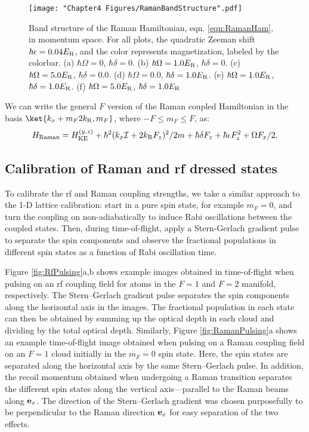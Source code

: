 \begin{figure}
	\texttt{[image: "Chapter4 Figures/RamanBandStructure".pdf]}
\caption[Band structure of the Raman Hamiltonian]{Band structure of the Raman Hamiltonian, eqn. \ref{eqn:RamanHam}, in momentum space. For all plots, the quadratic Zeeman shift $\hbar\epsilon = 0.04 E_{\rm R}$, and the color represents magnetization, labeled by the colorbar. (a) $\hbar\Omega=0$, $\hbar\delta = 0$. (b) $\hbar\Omega=1.0 E_{\rm R}$, $\hbar\delta = 0$. (c) $\hbar\Omega=5.0 E_{\rm R}$, $\hbar\delta = 0.0$. (d) $\hbar\Omega=0.0$, $\hbar\delta = 1.0 E_{\rm R}$. (e) $\hbar\Omega=1.0 E_{\rm R}$, $\hbar\delta = 1.0 E_{\rm R}$. (f) $\hbar\Omega=5.0 E_{\rm R}$, $\hbar\delta = 1.0 E_{\rm R}$}
\label{fig:RamanBandStruct}
\end{figure}

We can write the general $F$ version of the Raman coupled Hamiltonian in the basis $\ket{k_x + m_F 2k_{\rm R},m_F}$, where $-F\leq m_F \leq F$, as:
\begin{equation}
H_{\rm Raman} = H_{\rm KE}^{(y,z)} + \hbar^2 (k_x \mathcal{I} + 2k_{\rm R} F_z)^2/2m +  \hbar\delta F_z + \hbar \epsilon F^2_z + \Omega F_x/2.
\label{eqn:RamanAllF}
\end{equation}

\subsection{Calibration of Raman and rf dressed states}\label{sec:RamanCalib}
To calibrate the rf and Raman coupling strengths, we take a similar approach to the 1-D lattice calibration: start in a pure spin state, for example $m_F = 0$, and turn the coupling on non-adiabatically to induce Rabi oscillations between the coupled states. Then, during time-of-flight, apply a Stern-Gerlach gradient pulse to separate the spin components and observe the fractional populations in different spin states as a function of Rabi oscillation time.  

Figure \ref{fig:RfPulsing}a,b shows example images obtained in time-of-flight when pulsing on an rf coupling field for atoms in the $F=1$ and $F=2$ manifold, respectively. The Stern--Gerlach gradient pulse separates the spin components along the horizontal axis in the images. The fractional population in each state can then be obtained by summing up the optical depth in each cloud and dividing by the total optical depth. Similarly, Figure \ref{fig:RamanPulsing}a shows an example time-of-flight image obtained when pulsing on a Raman coupling field on an $F=1$ cloud initially in the $m_F=0$ spin state. Here, the spin states are separated along the horizontal axis by the same Stern--Gerlach pulse. In addition, the recoil momentum obtained when undergoing a Raman transition separates the different spin states along  the vertical axis---parallel to the Raman beams along ${\bf e}_x$. The direction of the Stern--Gerlach gradient was chosen purposefully to be perpendicular to the Raman direction ${\bf e}_x$ for easy separation of the two effects. 


